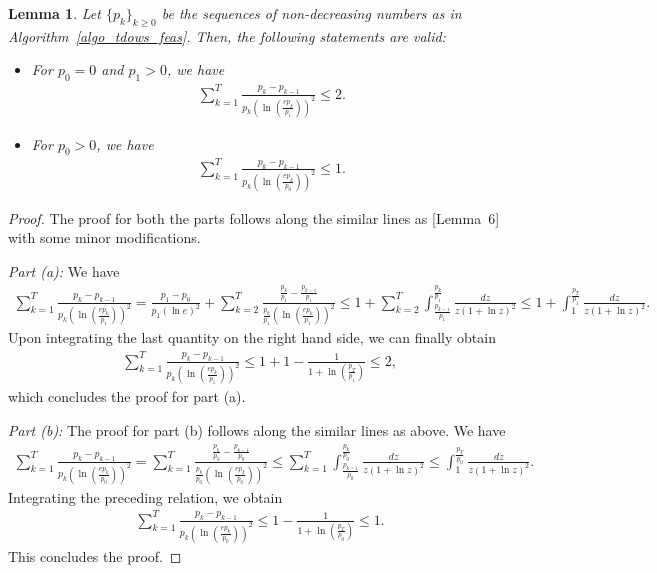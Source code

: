 \documentclass{article}
\theoremstyle{plain}
\newtheorem{lemma}[theorem]{Lemma}
\theoremstyle{definition}
\theoremstyle{remark}
\begin{document}
\begin{lemma}\label{lem_for_itr_bd_tdows}
    Let $\{p_k\}_{k \geq 0}$ be the sequences of non-decreasing numbers as in Algorithm~\ref{algo_tdows_feas}. Then, the following statements are valid:
    \begin{itemize}
        \item[(a)] For $p_0 = 0$ and $p_1 > 0$, we have
        \begin{align*}
            \sum_{k=1}^T \frac{p_k - p_{k-1}}{p_k \left(\ln \left( \frac{e p_k}{p_1} \right) \right)^2} \leq 2 .
        \end{align*}
        \item[(b)] For $p_0 > 0$, we have
        \begin{align*}
            \sum_{k=1}^T \frac{p_k - p_{k-1}}{p_k \left(\ln \left( \frac{e p_k}{p_0} \right) \right)^2} \leq 1 .
        \end{align*}
    \end{itemize}
\end{lemma}
%
%
\begin{proof}
    The proof for both the parts follows along the similar lines as \cite{ivgi2023dog} [Lemma~6] with some minor modifications. 
    
    \noindent\textit{Part (a):} We have
    \begin{align*}
        \sum_{k=1}^T \frac{p_k - p_{k-1}}{p_k \left(\ln \left( \frac{e p_k}{p_1} \right) \right)^2} = \frac{p_1 - p_0}{p_1 (\ln e)^2} + \sum_{k=2}^T \frac{ \frac{p_k}{p_1} - \frac{p_{k-1}}{p_1}}{\frac{p_k}{p_1} \left(\ln \left( \frac{e p_k}{p_1} \right) \right)^2} \leq 1 + \sum_{k=2}^T \int_{\frac{p_{k-1}}{p_1}}^{\frac{p_k}{p_1}} \frac{dz}{z(1+\ln z)^2} \leq 1 + \int_{1}^{\frac{p_T}{p_1}} \frac{dz}{z(1+\ln z)^2} .
    \end{align*}
    Upon integrating the last quantity on the right hand side, we can finally obtain
    \begin{align*}
        \sum_{k=1}^T \frac{p_k - p_{k-1}}{p_k \left(\ln \left( \frac{e p_k}{p_1} \right) \right)^2} \leq 1 + 1 - \frac{1}{1+\ln \left( \frac{p_T}{p_1} \right)} \leq 2 ,
    \end{align*}
    which concludes the proof for part (a).


    \noindent\textit{Part (b):} The proof for part (b) follows along the similar lines as above. We have
    \begin{align*}
        \sum_{k=1}^T \frac{p_k - p_{k-1}}{p_k \left(\ln \left( \frac{e p_k}{p_0} \right) \right)^2} = \sum_{k=1}^T \frac{ \frac{p_k}{p_0} - \frac{p_{k-1}}{p_0}}{\frac{p_k}{p_0} \left(\ln \left( \frac{e p_k}{p_0} \right) \right)^2} \leq \sum_{k=1}^T \int_{\frac{p_{k-1}}{p_0}}^{\frac{p_k}{p_0}} \frac{dz}{z(1+\ln z)^2} \leq \int_{1}^{\frac{p_T}{p_0}} \frac{dz}{z(1+\ln z)^2} .
    \end{align*}
    Integrating the preceding relation, we obtain
    \begin{align*}
        \sum_{k=1}^T \frac{p_k - p_{k-1}}{p_k \left(\ln \left( \frac{e p_k}{p_0} \right) \right)^2} \leq 1 - \frac{1}{1+\ln \left( \frac{p_T}{p_0} \right)} \leq 1 .
    \end{align*}
    This concludes the proof.
\end{proof}
\end{document}
